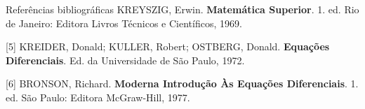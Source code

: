 \documentclass[blue]{beamer}
\numberwithin{equation}{section}
\begin{document}
\begin{frame}{Referências bibliográficas}
\justifying
[4] KREYSZIG, Erwin. \textbf{Matemática Superior}. 1. ed. Rio de Janeiro: Editora Livros Técnicos e Científicos, 1969.
	\vspace{0.5cm}

[5] KREIDER, Donald; KULLER, Robert; OSTBERG, Donald. \textbf{Equações Diferenciais}. Ed. da Universidade de São Paulo, 1972.
	\vspace{0.5cm}

[6] BRONSON, Richard. \textbf{Moderna Introdução Às Equações Diferenciais}. 1. ed. São Paulo: Editora McGraw-Hill, 1977.

\end{frame}
%
%
%
%
\begin{frame}
	 \\
\end{frame}
\end{document}
